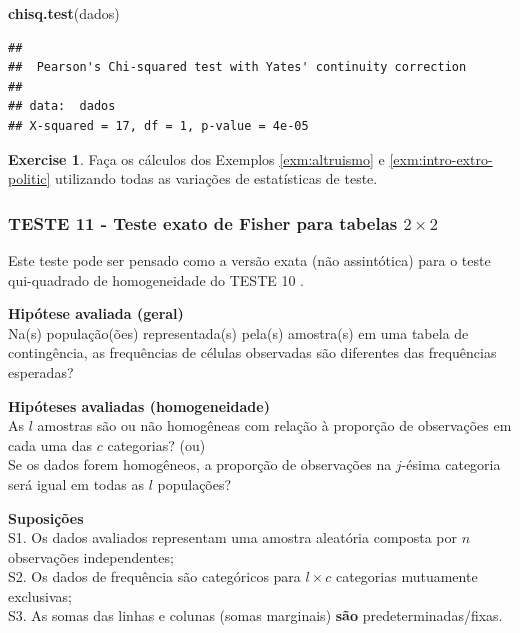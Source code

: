 \documentclass[
]{book}
\newenvironment{Shaded}{\begin{snugshade}}{\end{snugshade}}
\newcommand{\KeywordTok}[1]{\textcolor[rgb]{0.13,0.29,0.53}{\textbf{#1}}}
\newcommand{\NormalTok}[1]{#1}
\theoremstyle{definition}
\theoremstyle{definition}
\theoremstyle{definition}
\newtheorem{exercise}{Exercise}[chapter]
\theoremstyle{remark}
\begin{document}
\begin{Shaded}
\begin{Highlighting}[]
\KeywordTok{chisq.test}\NormalTok{(dados)}
\end{Highlighting}
\end{Shaded}

\begin{verbatim}
## 
##  Pearson's Chi-squared test with Yates' continuity correction
## 
## data:  dados
## X-squared = 17, df = 1, p-value = 4e-05
\end{verbatim}

\begin{exercise}
\protect\hypertarget{exr:exercicio-teste-qui-quadrado}{}{\label{exr:exercicio-teste-qui-quadrado} }Faça os cálculos dos Exemplos \ref{exm:altruismo} e \ref{exm:intro-extro-politic} utilizando todas as variações de estatísticas de teste.
\end{exercise}

\hypertarget{teste-11---teste-exato-de-fisher-para-tabelas-2-times-2}{%
\subsubsection*{\texorpdfstring{TESTE 11 - Teste exato de Fisher para tabelas \(2 \times 2\)}{TESTE 11 - Teste exato de Fisher para tabelas 2 \textbackslash times 2}}\label{teste-11---teste-exato-de-fisher-para-tabelas-2-times-2}}

Este teste pode ser pensado como a versão exata (não assintótica) para o teste qui-quadrado de homogeneidade do TESTE 10 .

\textbf{Hipótese avaliada (geral)}\\
Na(s) população(ões) representada(s) pela(s) amostra(s) em uma tabela de contingência, as frequências de células observadas são diferentes das frequências esperadas?

\textbf{Hipóteses avaliadas (homogeneidade)}\\
As \(l\) amostras são ou não homogêneas com relação à proporção de observações em cada uma das \(c\) categorias? (ou)\\
Se os dados forem homogêneos, a proporção de observações na \(j\)-ésima categoria será igual em todas as \(l\) populações?

\textbf{Suposições}\\
S1. Os dados avaliados representam uma amostra aleatória composta por \(n\) observações independentes;\\
S2. Os dados de frequência são categóricos para \(l \times c\) categorias mutuamente exclusivas;\\
S3. As somas das linhas e colunas (somas marginais) \textbf{são} predeterminadas/fixas.
\end{document}
